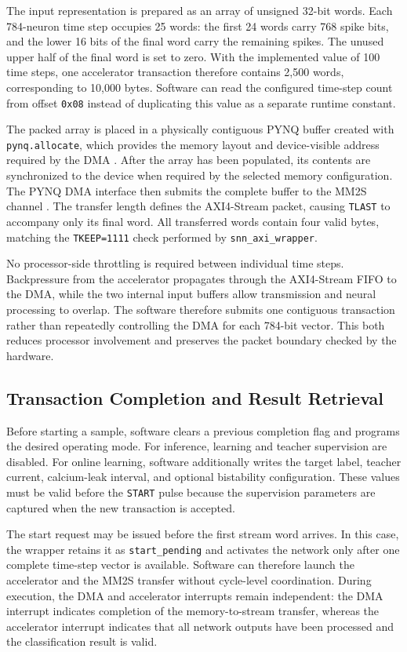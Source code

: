 The input representation is prepared as an array of unsigned 32-bit words. Each 784-neuron time step occupies 25 words: the first 24 words carry 768 spike bits, and the lower 16 bits of the final word carry the remaining spikes. The unused upper half of the final word is set to zero. With the implemented value of 100 time steps, one accelerator transaction therefore contains 2,500 words, corresponding to 10,000 bytes. Software can read the configured time-step count from offset \texttt{0x08} instead of duplicating this value as a separate runtime constant.

The packed array is placed in a physically contiguous PYNQ buffer created with \texttt{pynq.allocate}, which provides the memory layout and device-visible address required by the DMA \cite{PYNQBuffer}. After the array has been populated, its contents are synchronized to the device when required by the selected memory configuration. The PYNQ DMA interface then submits the complete buffer to the MM2S channel \cite{PYNQDMA}. The transfer length defines the AXI4-Stream packet, causing \texttt{TLAST} to accompany only its final word. All transferred words contain four valid bytes, matching the \texttt{TKEEP=1111} check performed by \texttt{snn\_axi\_wrapper}.

No processor-side throttling is required between individual time steps. Backpressure from the accelerator propagates through the AXI4-Stream FIFO to the DMA, while the two internal input buffers allow transmission and neural processing to overlap. The software therefore submits one contiguous transaction rather than repeatedly controlling the DMA for each 784-bit vector. This both reduces processor involvement and preserves the packet boundary checked by the hardware.

\subsection{Transaction Completion and Result Retrieval}

Before starting a sample, software clears a previous completion flag and programs the desired operating mode. For inference, learning and teacher supervision are disabled. For online learning, software additionally writes the target label, teacher current, calcium-leak interval, and optional bistability configuration. These values must be valid before the \texttt{START} pulse because the supervision parameters are captured when the new transaction is accepted.

The start request may be issued before the first stream word arrives. In this case, the wrapper retains it as \texttt{start\_pending} and activates the network only after one complete time-step vector is available. Software can therefore launch the accelerator and the MM2S transfer without cycle-level coordination. During execution, the DMA and accelerator interrupts remain independent: the DMA interrupt indicates completion of the memory-to-stream transfer, whereas the accelerator interrupt indicates that all network outputs have been processed and the classification result is valid.

